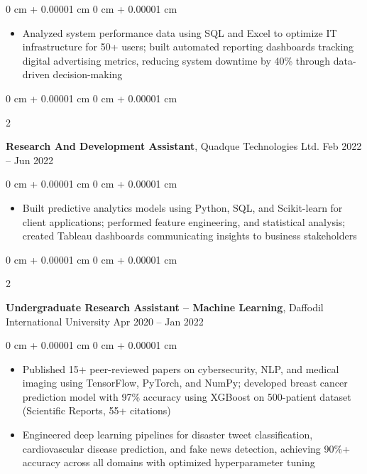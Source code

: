 \documentclass[9pt, letterpaper]{article}
\newenvironment{highlights}{
    \begin{itemize}[
        topsep=0.05 cm,
        parsep=0.05 cm,
        partopsep=0pt,
        itemsep=0pt,
        leftmargin=0 cm + 10pt
    ]
}{
    \end{itemize}
} %
\newenvironment{onecolentry}{
    \begin{adjustwidth}{
        0 cm + 0.00001 cm
    }{
        0 cm + 0.00001 cm
    }
}{
    \end{adjustwidth}
} %
\newenvironment{twocolentry}[2][]{
    \onecolentry
    \def\secondColumn{#2}
    \setcolumnwidth{\fill, 4.5 cm}
    \begin{paracol}{2}
}{
    \switchcolumn \raggedleft \secondColumn
    \end{paracol}
    \endonecolentry
} %
\begin{document}
\vspace{0.05 cm}
\begin{onecolentry}
    \begin{highlights}
\item Analyzed system performance data using SQL and Excel to optimize IT infrastructure for 50+ users; built automated reporting dashboards tracking digital advertising metrics, reducing system downtime by 40\% through data-driven decision-making
\end{highlights}
\end{onecolentry}
           \vspace{0.1 cm}
        
        \begin{twocolentry}{
            Feb 2022 – Jun 2022
        }
            \textbf{Research And Development Assistant}, Quadque Technologies Ltd.\end{twocolentry}
        
        \vspace{0.05 cm}
        \begin{onecolentry}
            \begin{highlights}
    \item Built predictive analytics models using Python, SQL, and Scikit-learn for client applications; performed feature engineering, and statistical analysis; created Tableau dashboards communicating insights to business stakeholders
\end{highlights}
        \end{onecolentry}
           \vspace{0.1 cm}
        
        \begin{twocolentry}{
            Apr 2020 – Jan 2022
        }
            \textbf{Undergraduate Research Assistant -- Machine Learning}, Daffodil International University\end{twocolentry}
        
        \vspace{0.05 cm}
        \begin{onecolentry}
\begin{highlights}
    \item Published 15+ peer-reviewed papers on cybersecurity, NLP, and medical imaging using TensorFlow, PyTorch, and NumPy; developed breast cancer prediction model with 97\% accuracy using XGBoost on 500-patient dataset (Scientific Reports, 55+ citations)
    
    \item Engineered deep learning pipelines for disaster tweet classification, cardiovascular disease prediction, and fake news detection, achieving 90\%+ accuracy across all domains with optimized hyperparameter tuning
\end{highlights}
        \end{onecolentry}
        \vspace{0.1 cm}
\end{document}
